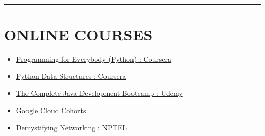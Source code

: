 \documentclass[a4paper,10pt]{article}
\begin{document}
\begin{paracol}{2}
\begin{itemize}
		\end{itemize}

	\vspace{1em}

	\hrule
	\section*{ONLINE COURSES}
		\begin{itemize}
			\item \href{https://www.coursera.org/account/accomplishments/certificate/9MSL99K95L8U}{Programming for Everybody (Python) : Coursera}
			\item \href{https://www.coursera.org/account/accomplishments/verify/3H4QGXNK6MPX}{Python Data Structures : Coursera}
			\item \href{https://www.udemy.com/certificate/UC-57fc4962-2320-48d8-b0d2-1b83573ecdd0/}{The Complete Java Development Bootcamp : Udemy}
			\item \href{https://www.cloudskillsboost.google/public_profiles/c9b7367d-4497-45bc-a027-7eaf2bb2bf8f}{Google Cloud Cohorts}
			\item \href{https://drive.google.com/file/d/1J4DTrLUJHfVtcJjgAT6V12THgwveibim/view?usp=sharing}{Demystifying Networking : NPTEL}
		\end{itemize}
		\vspace{1em}

\end{paracol}
\end{document}
